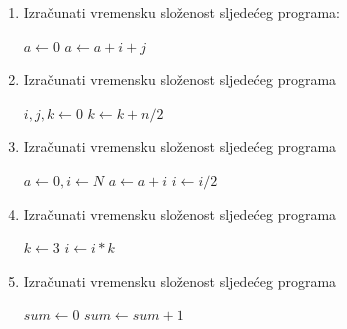 \begin{enumerate}
	\item Izračunati vremensku složenost sljedećeg programa:
	
	\begin{algorithm}[H]
		\begin{algorithmic}[1]
		    \State $ a \gets  0$
		    		\State $a \gets  a + i + j$
		         \EndFor
		     \EndFor
	    \EndProcedure	 	    
		\end{algorithmic}
	\end{algorithm}
\item Izračunati vremensku složenost sljedećeg programa 
	\begin{algorithm}[H]
	\begin{algorithmic}[1]
		\State $i, j, k \gets  0$
				\State $k \gets  k + n / 2$
			\EndFor
		\EndFor
	\EndProcedure	 
	\end{algorithmic}
\end{algorithm}
 \item Izračunati vremensku složenost sljedećeg programa 

	\begin{algorithm}[H]
	\begin{algorithmic}[1]
		\State $a \gets 0, i \gets N$
			\State $a \gets a+ i$
			\State $i \gets i / 2$
		\EndWhile
    \EndProcedure	 
	\end{algorithmic}
\end{algorithm}
 \item Izračunati vremensku složenost sljedećeg programa 

\begin{algorithm}[H]
	\begin{algorithmic}[1]
		\State $k \gets 3$
		    \State $i \gets i * k$
		\EndFor
	   \EndProcedure
	\end{algorithmic}
\end{algorithm}

 \item Izračunati vremensku složenost sljedećeg programa 

\begin{algorithm}[H]
	\begin{algorithmic}[1]
	  \State $sum \gets 0$
                      \State	$sum \gets sum + 1$
                 

\end{algorithmic}
\end{algorithm}
\end{enumerate}
